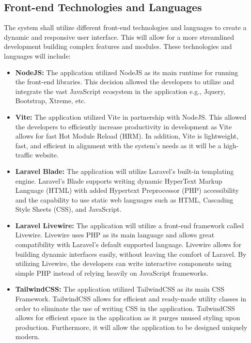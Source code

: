 \subsection{Front-end Technologies and Languages}
    The system shall utilize different front-end technologies and languages to create a dynamic and responsive user interface. This will allow for a more streamlined development building complex features and modules. These technologies and languages will include:
    
    \begin{itemize}
        \item[] \textbf{NodeJS:} The application utilized NodeJS as its main runtime for running the front-end libraries. This decision allowed the developers to utilize and integrate the vast JavaScript ecosystem in the application e.g., Jquery, Bootstrap, Xtreme, etc.
        \item[] \textbf{Vite:} The application utilized Vite in partnership with NodeJS. This allowed the developers to efficiently increase productivity in development as Vite allows for fast Hot Module Reload (HRM). In addition, Vite is lightweight, fast, and efficient in alignment with the system's needs as it will be a high-traffic website.
        \item[] \textbf{Laravel Blade:} The application will utilize Laravel's built-in templating engine. Laravel's Blade supports writing dynamic HyperText Markup Language (HTML) with added Hypertext Preprocessor (PHP) accessibility and the capability to use static web languages such as HTML, Cascading Style Sheets (CSS), and JavaScript.
        \item[] \textbf{Laravel Livewire:} The application will utilize a front-end framework called Livewire. Livewire uses PHP as its main language and allows great compatibility with Laravel's default supported language. Livewire allows for building dynamic interfaces easily, without leaving the comfort of Laravel. By utilizing Livewire, the developers can write interactive components using simple PHP instead of relying heavily on JavaScript frameworks.
        \item[] \textbf{TailwindCSS:} The application utilized TailwindCSS as its main CSS Framework. TailwindCSS allows for efficient and ready-made utility classes in order to eliminate the use of writing CSS in the application. TailwindCSS allows for efficient space in the application as it purges unused styling upon production. Furthermore, it will allow the application to be designed uniquely modern.
    \end{itemize}


